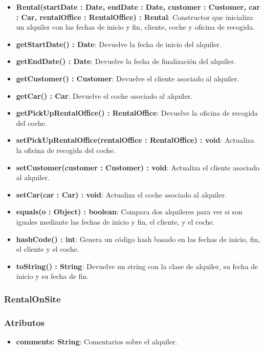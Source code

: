 \begin{itemize}
    \item \textbf{Rental(startDate : Date, endDate : Date, customer : Customer, car : Car, rentalOffice : RentalOffice) : Rental}: 
    Constructor que inicializa un alquiler con las fechas de inicio y fin, cliente, coche y oficina de recogida.
    
    \item \textbf{getStartDate() : Date}: Devuelve la fecha de inicio del alquiler.
    \item \textbf{getEndDate() : Date}: Devuelve la fecha de finalización del alquiler.
    \item \textbf{getCustomer() : Customer}: Devuelve el cliente asociado al alquiler.
    \item \textbf{getCar() : Car}: Devuelve el coche asociado al alquiler.
    \item \textbf{getPickUpRentalOffice() : RentalOffice}: Devuelve la oficina de recogida del coche.
    \item \textbf{setPickUpRentalOffice(rentalOffice : RentalOffice) : void}: Actualiza la oficina de recogida del coche.
    \item \textbf{setCustomer(customer : Customer) : void}: Actualiza el cliente asociado al alquiler.
    \item \textbf{setCar(car : Car) : void}: Actualiza el coche asociado al alquiler.
    \item \textbf{equals(o : Object) : boolean}: Compara dos alquileres para ver si son iguales mediante las fechas de inicio y fin, el cliente, y el coche.
    \item \textbf{hashCode() : int}: Genera un código hash basado en las fechas de inicio, fin, el cliente y el coche.
    \item \textbf{toString() : String}: Devuelve un string con la clase de alquiler, su fecha de inicio y su fecha de fin.
\end{itemize}

\subsubsection{RentalOnSite}

\subsubsection*{Atributos}

\begin{itemize}
    \item \textbf{comments: String}: Comentarios sobre el alquiler. 
\end{itemize}

